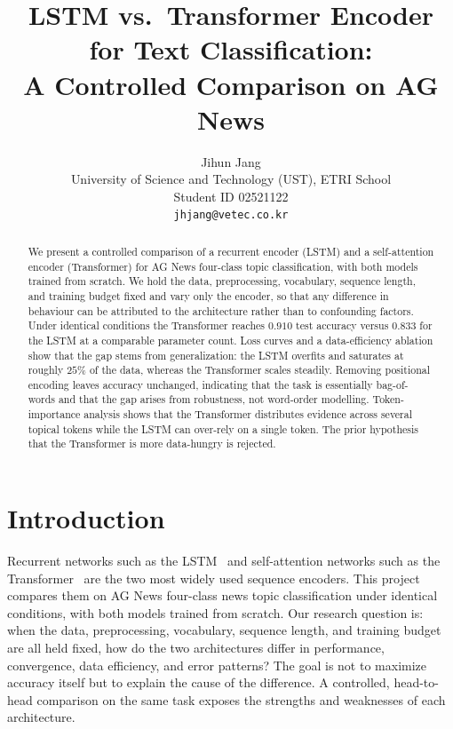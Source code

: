 \documentclass[10pt,twocolumn,letterpaper]{article}
\begin{document}
\title{LSTM vs.\ Transformer Encoder for Text Classification:\\
A Controlled Comparison on AG News}

\author{Jihun Jang\\
University of Science and Technology (UST), ETRI School\\
Student ID 02521122\\
{\tt\small jhjang@vetec.co.kr}
}

\maketitle

\begin{abstract}
We present a controlled comparison of a recurrent encoder (LSTM) and a
self-attention encoder (Transformer) for AG News four-class topic
classification, with both models trained from scratch. We hold the data,
preprocessing, vocabulary, sequence length, and training budget fixed and
vary only the encoder, so that any difference in behaviour can be attributed
to the architecture rather than to confounding factors. Under identical
conditions the Transformer reaches $0.910$ test accuracy versus $0.833$ for
the LSTM at a comparable parameter count. Loss curves and a data-efficiency
ablation show that the gap stems from generalization: the LSTM overfits and
saturates at roughly $25\%$ of the data, whereas the Transformer scales
steadily. Removing positional encoding leaves accuracy unchanged, indicating
that the task is essentially bag-of-words and that the gap arises from
robustness, not word-order modelling. Token-importance analysis shows that
the Transformer distributes evidence across several topical tokens while the
LSTM can over-rely on a single token. The prior hypothesis that the
Transformer is more data-hungry is rejected.
\end{abstract}

\section{Introduction}
Recurrent networks such as the LSTM~\cite{hochreiter1997lstm} and
self-attention networks such as the Transformer~\cite{vaswani2017attention}
are the two most widely used sequence encoders. This project compares them on
AG News four-class news topic classification under identical conditions, with
both models trained from scratch. Our research question is: when the data,
preprocessing, vocabulary, sequence length, and training budget are all held
fixed, how do the two architectures differ in performance, convergence, data
efficiency, and error patterns? The goal is not to maximize accuracy itself
but to explain the cause of the difference. A controlled, head-to-head
comparison on the same task exposes the strengths and weaknesses of each
architecture.
\end{document}

